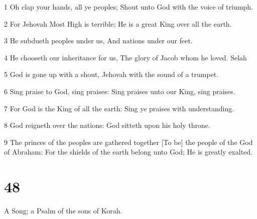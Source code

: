 \par 1 Oh clap your hands, all ye peoples; Shout unto God with the voice of triumph.
\par 2 For Jehovah Most High is terrible; He is a great King over all the earth.
\par 3 He subdueth peoples under us, And nations under our feet.
\par 4 He chooseth our inheritance for us, The glory of Jacob whom he loved. Selah
\par 5 God is gone up with a shout, Jehovah with the sound of a trumpet.
\par 6 Sing praise to God, sing praises: Sing praises unto our King, sing praises.
\par 7 For God is the King of all the earth: Sing ye praises with understanding.
\par 8 God reigneth over the nations: God sitteth upon his holy throne.
\par 9 The princes of the peoples are gathered together [To be] the people of the God of Abraham: For the shields of the earth belong unto God; He is greatly exalted.

\chapter{48}

\par A Song; a Psalm of the sons of Korah.

